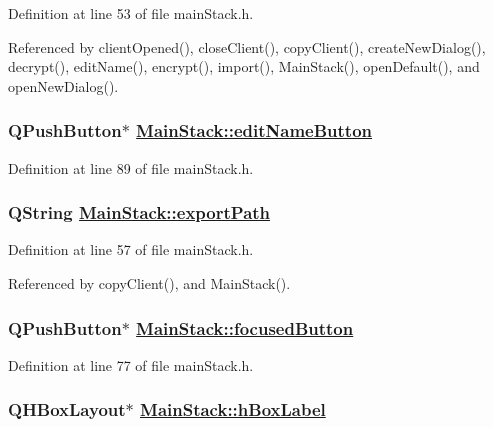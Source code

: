 Definition at line 53 of file main\-Stack.h.

Referenced by client\-Opened(), close\-Client(), copy\-Client(), create\-New\-Dialog(), decrypt(), edit\-Name(), encrypt(), import(), Main\-Stack(), open\-Default(), and open\-New\-Dialog().\hypertarget{classMainStack_r30}{
\subsubsection[editNameButton]{\setlength{\rightskip}{0pt plus 5cm}QPush\-Button$\ast$ \hyperlink{classMainStack_r30}{Main\-Stack::edit\-Name\-Button}}}
\label{classMainStack_r30}


Definition at line 89 of file main\-Stack.h.\hypertarget{classMainStack_r3}{
\subsubsection[exportPath]{\setlength{\rightskip}{0pt plus 5cm}QString \hyperlink{classMainStack_r3}{Main\-Stack::export\-Path}}}
\label{classMainStack_r3}


Definition at line 57 of file main\-Stack.h.

Referenced by copy\-Client(), and Main\-Stack().\hypertarget{classMainStack_r18}{
\subsubsection[focusedButton]{\setlength{\rightskip}{0pt plus 5cm}QPush\-Button$\ast$ \hyperlink{classMainStack_r18}{Main\-Stack::focused\-Button}}}
\label{classMainStack_r18}


Definition at line 77 of file main\-Stack.h.\hypertarget{classMainStack_r21}{
\subsubsection[hBoxLabel]{\setlength{\rightskip}{0pt plus 5cm}QHBox\-Layout$\ast$ \hyperlink{classMainStack_r21}{Main\-Stack::h\-Box\-Label}}}
\label{classMainStack_r21}


